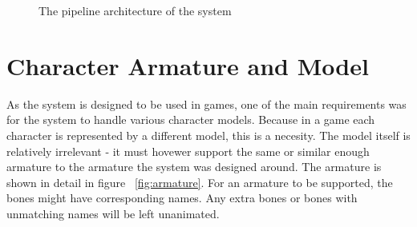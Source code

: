 \begin{figure}[!ht]
\centerline{}
\caption{The pipeline architecture of the system}\label{fig:architecture}
\end{figure}

\section{Character Armature and Model}

As the system is designed to be used in games, one of the main requirements was for the system to handle various character models. Because in a game each character is represented by a different model, this is a necesity. The model itself is relatively irrelevant - it must hovewer support the same or similar enough armature to the armature the system was designed around. The armature is shown in detail in figure ~\ref{fig:armature}. For an armature to be supported, the bones might have corresponding names. Any extra bones or bones with unmatching names will be left unanimated.

